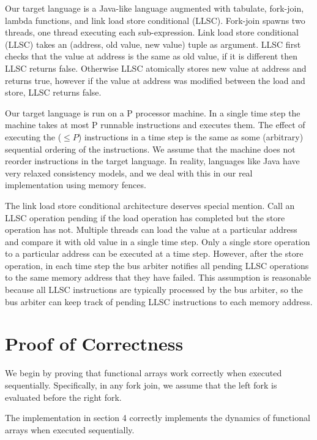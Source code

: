 \documentclass[preprint]{sigplanconf}
\begin{document}
Our target language is a Java-like language augmented with tabulate, fork-join, lambda functions, and link load store conditional (LLSC). Fork-join spawns two threads, one thread executing each sub-expression. Link load store conditional (LLSC) takes an (address, old value, new value) tuple as argument. LLSC first checks that the value at address is the same as old value, if it is different then LLSC returns false. Otherwise LLSC atomically stores new value at address and returns true, however if the value at address was modified between the load and store, LLSC returns false.

Our target language is run on a P processor machine. In a single time step the machine takes at most P runnable instructions and executes them.  The effect of executing the ($\leq P$) instructions in a time step is the same as some (arbitrary) sequential ordering of the instructions. We assume that the machine does not reorder instructions in the target language. In reality, languages like Java have very relaxed consistency models, and we deal with this in our real implementation using memory fences.

The link load store conditional architecture deserves special mention. Call an LLSC operation pending if the load operation has completed but the store operation has not. Multiple threads can load the value at a particular address and compare it with old value in a single time step. Only a single store operation to a particular address can be executed at a time step. However, after the store operation, in each time step the bus arbiter notifies all pending LLSC operations to the same memory address that they have failed. This assumption is reasonable because all LLSC instructions are typically processed by the bus arbiter, so the bus arbiter can keep track of pending LLSC instructions to each memory address.

\section{Proof of Correctness}

We begin by proving that functional arrays work correctly when executed sequentially. Specifically, in any fork join, we assume that the left fork is evaluated before the right fork.

\begin{lemma}
The implementation in section 4 correctly implements the dynamics of functional arrays when executed sequentially.
\end{lemma}
\end{document}
